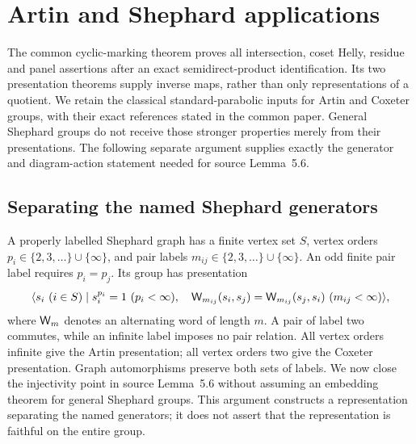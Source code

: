 \section{Artin and Shephard applications}\label{sec:app-artin}
The common cyclic-marking theorem proves all intersection, coset Helly, residue and panel assertions after an exact semidirect-product identification. Its two presentation theorems supply inverse maps, rather than only representations of a quotient. We retain the classical standard-parabolic inputs for Artin and Coxeter groups, with their exact references stated in the common paper. General Shephard groups do not receive those stronger properties merely from their presentations. The following separate argument supplies exactly the generator and diagram-action statement needed for source Lemma~5.6.

\subsection{Separating the named Shephard generators}\label{S-sec:reflection}

A properly labelled Shephard graph has a finite vertex set $S$, vertex orders
$p_i\in\{2,3,\ldots\}\cup\{\infty\}$, and pair labels
$m_{ij}\in\{2,3,\ldots\}\cup\{\infty\}$. An odd finite pair label
requires $p_i=p_j$. Its group has presentation
\[
 \langle s_i\ (i\in S)\mid s_i^{p_i}=1\ (p_i<\infty),\quad
 \W_{m_{ij}}(s_i,s_j)=\W_{m_{ij}}(s_j,s_i)\ (m_{ij}<\infty)\rangle,
\]
where $\mathsf W_m$ denotes an alternating word of length $m$. A pair of label two
commutes, while an infinite label imposes no pair relation. All vertex
orders infinite give the Artin presentation; all vertex orders two give
the Coxeter presentation. Graph automorphisms preserve both sets of labels.
We now close the injectivity point in source Lemma~5.6 without assuming
an embedding theorem for general Shephard groups. This argument constructs
a representation separating the named generators; it does not assert that
the representation is faithful on the entire group.

